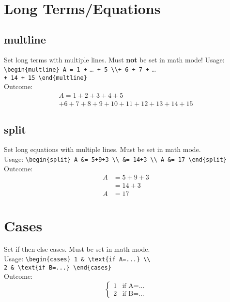 \documentclass[draft]{cheatsht}
\newcommand{\notx}{\textbf{not} }
\begin{document}
\section{Long Terms/Equations}
\subsection{multline}
Set long terms with multiple lines. Must \notx be set in math mode!
Usage: \verb!\begin{multline} A = 1 +! \ldots~\verb!+ 5 \\+ 6 + 7 +! \ldots \\
\verb!+ 14 + 15 \end{multline}!\\
Outcome:
\begin{multline} A = 1 + 2 + 3 + 4 + 5 \\
  + 6 + 7 + 8 + 9 + 10 + 11 + 12 + 13 + 14 + 15
\end{multline}

\subsection{split}
Set long equations with multiple lines. Must be set in math mode. \\
Usage: \verb!\begin{split} A &= 5+9+3 \\ &= 14+3 \\ A &= 17 \end{split}!
Outcome: \begin{displaymath}
  \begin{split} A &= 5+9+3 \\ &= 14+3 \\ A &= 17 \end{split}
\end{displaymath}

\section{Cases}
Set if-then-else cases. Must be set in math mode.\\
Usage: \verb!\begin{cases} 1 & \text{if A=...} \\!\\
\verb!2 & \text{if B=...} \end{cases}!\\
Outcome:\begin{displaymath}\begin{cases}
1&\text{if A=...}\\
2&\text{if B=...}
\end{cases}\end{displaymath}
\end{document}
